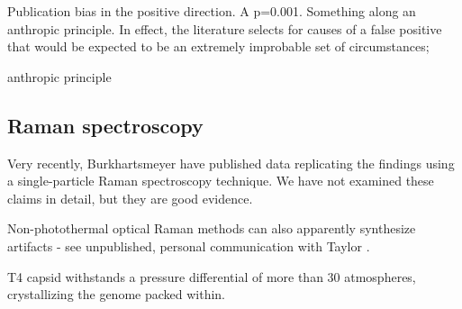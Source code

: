 \documentclass[paper.tex]{subfiles}
\begin{document}
Publication bias in the positive direction. A p=0.001. Something along an anthropic principle. In effect, the literature selects for causes of a false positive that would be expected to be an extremely improbable set of circumstances; 

anthropic principle


\subsection{Raman spectroscopy}

Very recently, Burkhartsmeyer \cite{Optical2020} have published data replicating the findings using a single-particle Raman spectroscopy technique. We have not examined these claims in detail, but they are good evidence.

Non-photothermal optical Raman methods can also apparently synthesize artifacts - see unpublished, personal communication with Taylor \cite{mechanisms1981}. 






T4 capsid withstands a pressure differential of more than 30 atmospheres, crystallizing the genome packed within.





\cite{Osmotic2003}
\end{document}
